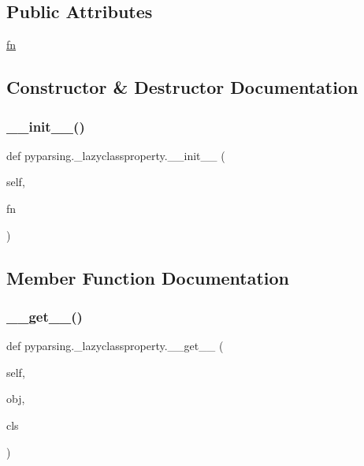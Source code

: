 \subsection*{Public Attributes}
\begin{DoxyCompactItemize}
\item 
\hyperlink{classpyparsing_1_1__lazyclassproperty_af8ec3b1a829489fad550c8b9ba066f90}{fn}
\end{DoxyCompactItemize}


\subsection{Constructor \& Destructor Documentation}
\mbox{\label{classpyparsing_1_1__lazyclassproperty_a863cabf13208a70619f135c0e08a395f}} 
\subsubsection{\texorpdfstring{\+\_\+\+\_\+init\+\_\+\+\_\+()}{\_\_init\_\_()}}
{\footnotesize\ttfamily def pyparsing.\+\_\+lazyclassproperty.\+\_\+\+\_\+init\+\_\+\+\_\+ (\begin{DoxyParamCaption}\item[{}]{self,  }\item[{}]{fn }\end{DoxyParamCaption})}



\subsection{Member Function Documentation}
\mbox{\label{classpyparsing_1_1__lazyclassproperty_aec562d4948d7d837036d203d03a7aec2}} 
\subsubsection{\texorpdfstring{\+\_\+\+\_\+get\+\_\+\+\_\+()}{\_\_get\_\_()}}
{\footnotesize\ttfamily def pyparsing.\+\_\+lazyclassproperty.\+\_\+\+\_\+get\+\_\+\+\_\+ (\begin{DoxyParamCaption}\item[{}]{self,  }\item[{}]{obj,  }\item[{}]{cls }\end{DoxyParamCaption})}



